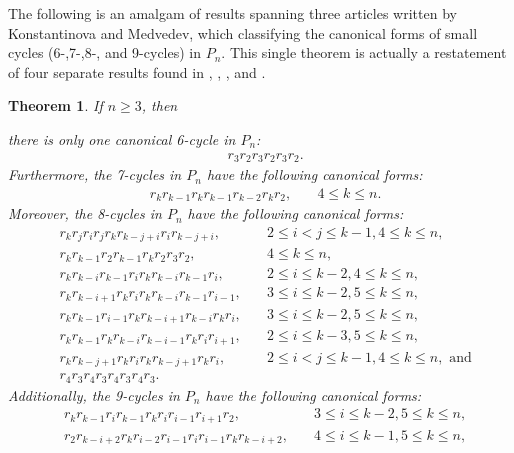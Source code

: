 \documentclass[final]{dmtcs-episciences}
\numberwithin{equation}{section}
\newtheorem{thm}{Theorem}[section]
\begin{document}
The following is an amalgam of results spanning three articles written by Konstantinova and Medvedev, which classifying the canonical forms of small cycles (6-,7-,8-, and 9-cycles) in $P_n$. This single theorem is actually a restatement of four separate results found in \cite[Lemma 3]{KM10}, \cite[Theorem 1]{KM10}, \cite[Theorem 1.3]{KonMed}, and \cite[Theorem 4]{KM11}.
\begin{thm}\label{t:cycleclassification} If $n\geq3$, then

there is only one canonical 6-cycle in $P_n$:
\begin{align}
    \label{P6-1}&r_3 r_2 r_3 r_2 r_3 r_2.
\end{align}
Furthermore, the 7-cycles in $P_n$ have the following canonical forms:
\begin{align}
    \label{P7-1}&r_k r_{k-1} r_k r_{k-1} r_{k-2} r_k r_2, &\quad 4 \leq k \leq n.
\end{align}
Moreover, the 8-cycles in $P_n$ have the following canonical forms: 
\begin{align}
    \label{P8-1}&r_{k}r_{j}r_{i}r_{j}r_{k}r_{k-j+i}r_{i}r_{k-j+i}, &\quad 2 \leq i < j \leq k-1, 4 \leq k \leq n,\\
    \label{P8-2}&r_{k}r_{k-1}r_{2}r_{k-1}r_{k}r_{2}r_{3}r_{2}, &\quad 4 \leq k \leq  n,\\
    \label{P8-3}&r_{k}r_{k-i}r_{k-1}r_{i}r_{k}r_{k-i}r_{k-1}r_{i}, &\quad 2 \leq i \leq k-2, 4 \leq k \leq n,\\
    \label{P8-4}&r_{k}r_{k-i+1}r_{k}r_{i}r_{k}r_{k-i}r_{k-1}r_{i-1}, &\quad 3 \leq i \leq k-2, 5 \leq k \leq n,\\
    \label{P8-5}&r_{k}r_{k-1}r_{i-1}r_{k}r_{k-i+1}r_{k-i}r_{k}r_{i}, &\quad 3 \leq i \leq k-2, 5 \leq k \leq n,\\
    \label{P8-6}&r_{k}r_{k-1}r_{k}r_{k-i}r_{k-i-1}r_{k}r_{i}r_{i+1}, &\quad 2 \leq i \leq k-3, 5 \leq k \leq n,\\
    \label{P8-7}&r_{k}r_{k-j+1}r_{k}r_{i}r_{k}r_{k-j+1}r_{k}r_{i}, &\quad 2 \leq i < j \leq k-1, 4 \leq k \leq n,\text{ and}\\
    \label{P8-8}&r_4r_3r_4r_3r_4r_3r_4r_3.
\end{align}
Additionally, the 9-cycles in $P_n$ have the following canonical forms:
\begin{align}
    \label{P9-1}&r_{k}r_{k-1}r_{i}r_{k-1}r_{k}r_{i}r_{i-1}r_{i+1}r_{2}, &\quad 3 \leq i \leq k-2, 5 \leq k \leq n,\\
    \label{P9-2}&r_{2}r_{k-i+2}r_{k}r_{i-2}r_{i-1}r_{i}r_{i-1}r_{k}r_{k-i+2}, &\quad 4 \leq i \leq k-1, 5 \leq k \leq n,\\

\end{align}
\end{thm}
\end{document}
